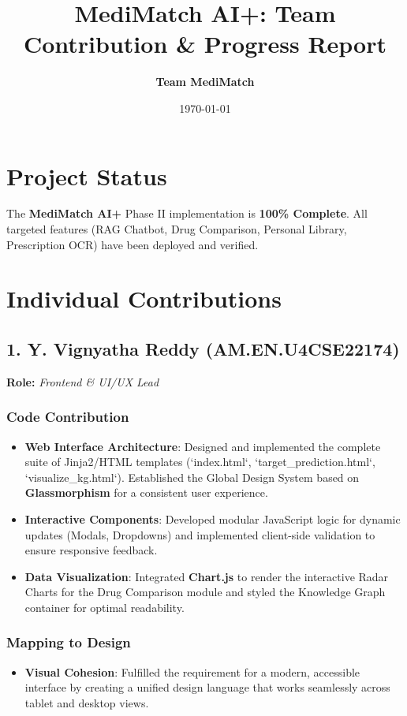 \documentclass[a4paper,12pt]{article}
\title{\textbf{MediMatch AI+: Team Contribution \& Progress Report}}
\author{\textbf{Team MediMatch}}
\date{\today}
\begin{document}
\maketitle

\section{Project Status}
The \textbf{MediMatch AI+} Phase II implementation is \textbf{100\% Complete}. All targeted features (RAG Chatbot, Drug Comparison, Personal Library, Prescription OCR) have been deployed and verified.

\section{Individual Contributions}

\subsection*{1. Y. Vignyatha Reddy (AM.EN.U4CSE22174)}
\textbf{Role:} \textit{Frontend \& UI/UX Lead}

\subsubsection*{Code Contribution}
\begin{itemize}
    \item \textbf{Web Interface Architecture}: Designed and implemented the complete suite of Jinja2/HTML templates (`index.html`, `target_prediction.html`, `visualize_kg.html`). Established the Global Design System based on \textbf{Glassmorphism} for a consistent user experience.
    \item \textbf{Interactive Components}: Developed modular JavaScript logic for dynamic updates (Modals, Dropdowns) and implemented client-side validation to ensure responsive feedback.
    \item \textbf{Data Visualization}: Integrated \textbf{Chart.js} to render the interactive Radar Charts for the Drug Comparison module and styled the Knowledge Graph container for optimal readability.
\end{itemize}

\subsubsection*{Mapping to Design}
\begin{itemize}
    \item \textbf{Visual Cohesion}: Fulfilled the requirement for a modern, accessible interface by creating a unified design language that works seamlessly across tablet and desktop views.
\end{itemize}
\end{document}

